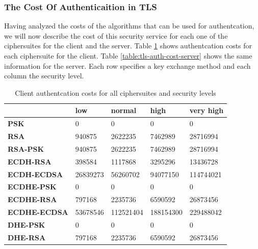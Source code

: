 \documentclass{llncs}
\begin{document}
\subsubsection{The Cost Of Authenticaition in TLS}

Having analyzed the costs of the algorithms that can be used for authentcation, we will now describe the cost of this security service
for each one of the ciphersuites for the client and the server. Table \ref{table:tls-auth-cost-client} shows authentcation costs for each
ciphersuite for the client. Table \ref{table:tls-auth-cost-server} shows the same information for the server. Each row specifies a key
exchange method and each column the security level.

\begin{table}[]
  \begin{tabular}{|l|l|l|l|l|}
  \hline
                       & \textbf{low} & \textbf{normal} & \textbf{high} & \textbf{very high} \\ \hline
  \textbf{PSK}         & 0            & 0               & 0             & 0                  \\ \hline
  \textbf{RSA}         & 940875       & 2622235         & 7462989       & 28716994           \\ \hline
  \textbf{RSA-PSK}     & 940875       & 2622235         & 7462989       & 28716994           \\ \hline
  \textbf{ECDH-RSA}    & 398584       & 1117868         & 3295296       & 13436728           \\ \hline
  \textbf{ECDH-ECDSA}  & 26839273     & 56260702        & 94077150      & 114744021          \\ \hline
  \textbf{ECDHE-PSK}   & 0            & 0               & 0             & 0                  \\ \hline
  \textbf{ECDHE-RSA}   & 797168       & 2235736         & 6590592       & 26873456           \\ \hline
  \textbf{ECDHE-ECDSA} & 53678546     & 112521404       & 188154300     & 229488042          \\ \hline
  \textbf{DHE-PSK}     & 0            & 0               & 0             & 0                  \\ \hline
  \textbf{DHE-RSA}     & 797168       & 2235736         & 6590592       & 26873456           \\ \hline
  \end{tabular}
  \caption{\label{table:tls-auth-cost-client} Client authentcation costs for all ciphersuites and security levels}
  \end{table}
\end{document}
